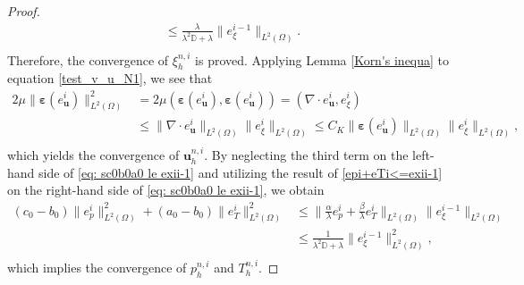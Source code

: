 \documentclass{article}
\numberwithin{equation}{section}
\begin{document}
\begin{proof}
\begin{equation}
\begin{aligned}
   \le\frac\lambda{\lambda^2\mathbb{D}+\lambda}\|e_{\xi}^{i-1}\|_{L^2(\Omega)}.\\
\end{aligned}
\end{equation} 
Therefore, the convergence of $\xi_h^{n, i}$ is proved.
Applying Lemma \ref{Korn's inequa} to equation \eqref{test_v_u_N1}, we see that
\begin{equation}      
\begin{aligned}   
  2\mu\|\bm\varepsilon(e_{\bm u}^i)\|_{L^2(\Omega)}^2 &=2\mu(\bm\varepsilon(e_{\bm u}^{i}),\bm\varepsilon(e_{\bm u}^{i})) =  (\nabla\cdot e_{\bm u}^i,e_{\xi}^i) \\
  &\le \|\nabla\cdot e_{\bm u}^i\|_{L^2(\Omega)}\| e_{\xi}^i\|_{L^2(\Omega)} 
   \le  C_K\|\bm\varepsilon(e_{\bm u}^i)\|_{L^2(\Omega)}\| e_{\xi}^i\|_{L^2(\Omega)}  , \\
\end{aligned}
\end{equation} 
which yields the convergence of $\bm u_h^{n,i}$. 
By neglecting the third term on the left-hand side of \eqref{eq: sc0b0a0 le exii-1} and utilizing the result of \eqref{epi+eTi<=exii-1} on the right-hand side of \eqref{eq: sc0b0a0 le exii-1}, we obtain
\begin{equation}      
\begin{aligned}
 (c_0-b_0)\|e_{p}^i\|_{L^2(\Omega)}^2+(a_0-b_0)\|e_{T}^i\|_{L^2(\Omega)}^2 
&\le     \|\frac\alpha\lambda e_{p}^i+\frac\beta\lambda e_{T}^i \|_{L^2(\Omega)}  \|e_{\xi}^{i-1}\|_{L^2(\Omega)}\\
& \le \frac1{\lambda^2\mathbb{D}+\lambda}\|e_{\xi}^{i-1}\|_{L^2(\Omega)}^2,  \\
\end{aligned}
\end{equation} 
 which implies the convergence of $p_h^{n,i}$ and $T_h^{n,i}$.
\end{proof}
\end{document}
